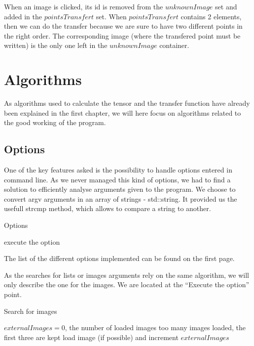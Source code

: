 \documentclass[a4paper,10pt]{report}
\begin{document}
When an image is clicked, its id is removed from the $unknownImage$ set and added in the $pointsTransfert$ set. 
When $pointsTransfert$ contains 2 elements, then we can do the transfer because we are sure to have two different points in the right order. 
The corresponding image (where the transfered point must be written) is the only one left in the $unknownImage$ container.
\\

\section{Algorithms}
As algorithms used to calculate the tensor and the transfer function have already been explained
in the first chapter, we will here focus on algorithms related to the good working of the program.
\\

\subsection{Options}
One of the key features asked is the possibility to handle options entered in command line. As we never 
managed this kind of options, we had to find a solution to efficiently analyse arguments given to the
program. We choose to convert argv arguments in an array of strings - std::string. It provided us the
usefull strcmp method, which allows to compare a string to another.

\begin{algorithm}
\caption{Options}
\begin{algorithmic}
\STATE execute the option
\ENDIF
\ENDFOR
\ENDFOR
\end{algorithmic}
\end{algorithm}

The list of the different options implemented can be found on the first page.

As the searches for lists or images arguments rely on the same algorithm, we will only describe the one
for the images. We are located at the ``Execute the option'' point.

\begin{algorithm}
\caption{Search for images}
\begin{algorithmic}
\REQUIRE $externalImages = 0$, the number of loaded images
\STATE too many images loaded, the first three are kept
\ELSE 
\STATE load image (if possible) and increment $externalImages$
\ENDIF
\ENDIF
\end{algorithmic}
\end{algorithm}
\end{document}

